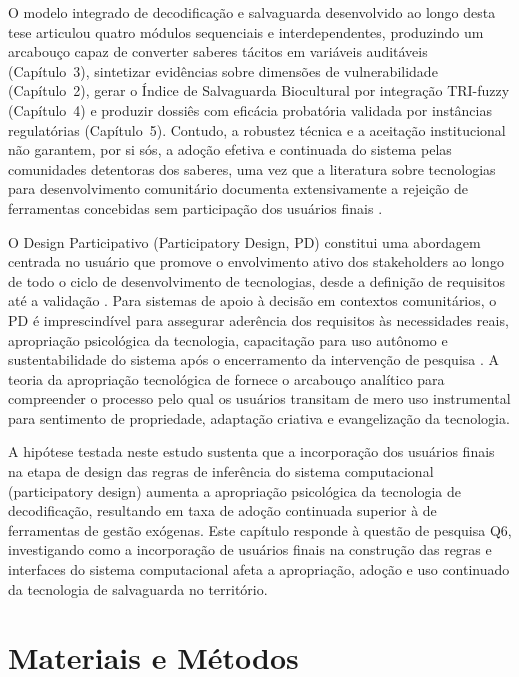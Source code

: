 O modelo integrado de decodificação e salvaguarda desenvolvido ao longo desta tese articulou quatro módulos sequenciais e interdependentes, produzindo um arcabouço capaz de converter saberes tácitos em variáveis auditáveis (Capítulo~3), sintetizar evidências sobre dimensões de vulnerabilidade (Capítulo~2), gerar o Índice de Salvaguarda Biocultural por integração TRI-fuzzy (Capítulo~4) e produzir dossiês com eficácia probatória validada por instâncias regulatórias (Capítulo~5). Contudo, a robustez técnica e a aceitação institucional não garantem, por si sós, a adoção efetiva e continuada do sistema pelas comunidades detentoras dos saberes, uma vez que a literatura sobre tecnologias para desenvolvimento comunitário documenta extensivamente a rejeição de ferramentas concebidas sem participação dos usuários finais \cite{Schuler1993,Simonsen2012}.

O Design Participativo (Participatory Design, PD) constitui uma abordagem centrada no usuário que promove o envolvimento ativo dos stakeholders ao longo de todo o ciclo de desenvolvimento de tecnologias, desde a definição de requisitos até a validação \cite{Schuler1993}. Para sistemas de apoio à decisão em contextos comunitários, o PD é imprescindível para assegurar aderência dos requisitos às necessidades reais, apropriação psicológica da tecnologia, capacitação para uso autônomo e sustentabilidade do sistema após o encerramento da intervenção de pesquisa \cite{Simonsen2012}. A teoria da apropriação tecnológica de  fornece o arcabouço analítico para compreender o processo pelo qual os usuários transitam de mero uso instrumental para sentimento de propriedade, adaptação criativa e evangelização da tecnologia.

A hipótese testada neste estudo sustenta que a incorporação dos usuários finais na etapa de design das regras de inferência do sistema computacional (participatory design) aumenta a apropriação psicológica da tecnologia de decodificação, resultando em taxa de adoção continuada superior à de ferramentas de gestão exógenas. Este capítulo responde à questão de pesquisa Q6, investigando como a incorporação de usuários finais na construção das regras e interfaces do sistema computacional afeta a apropriação, adoção e uso continuado da tecnologia de salvaguarda no território.


\section{Materiais e Métodos}


